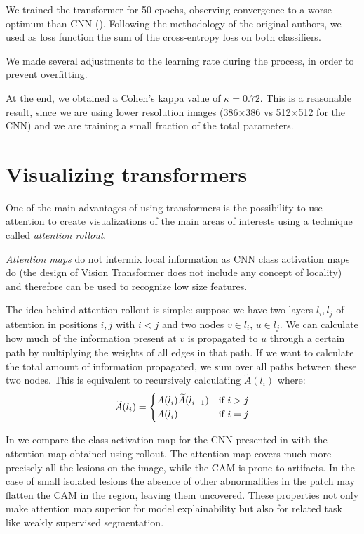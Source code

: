 We trained the transformer for 50 epochs, observing convergence to a worse optimum than CNN (). Following the methodology of the original authors, we used as loss function the sum of the cross-entropy loss on both classifiers.

We made several adjustments to the learning rate during the process, in order to prevent overfitting. 

At the end, we obtained a Cohen's kappa value of \( \kappa = 0.72 \). This is a reasonable result, since we are using lower resolution images (386×386 vs 512×512 for the CNN) and we are training a small fraction of the total parameters.

\section{Visualizing transformers}
One of the main advantages of using transformers is the possibility to use attention to create visualizations of the main areas of interests using a technique called \textit{attention rollout}\cite{abnar2020quantifying}.

\textit{Attention maps} do not intermix local information as CNN class activation maps do (the design of Vision Transformer does not include any concept of locality) and therefore can be used to recognize low size features\cite{dosovitskiy2020image}.

The idea behind attention rollout is simple: suppose we have two layers \( l_i, l_j \) of attention in positions \( i, j \) with \( i < j\) and two nodes \( v \in l_i \), \( u \in l_j \). We can calculate how much of the information present at \( v \) is propagated to \( u \) through a certain path by multiplying the weights of all edges in that path. If we want to calculate the total amount of information propagated, we sum over all paths between these two nodes. This is equivalent to recursively calculating \( \widetilde{A}(l_{i})\) where:
\[
\widetilde{A}(l_{i}) = \begin{cases}
A(l_i) \widetilde{A}(l_{i-1}) & \text{if \( i > j\)} \\
A(l_i)  & \text{if \( i = j\)} \\
\end{cases}
\]

In  we compare the class activation map for the CNN presented in  with the attention map obtained using rollout. The attention map covers much more precisely all the lesions on the image, while the CAM is prone to artifacts. In the case of small isolated lesions the absence of other abnormalities in the patch may flatten the CAM in the region, leaving them uncovered. These properties not only make attention map superior for model explainability but also for related task like weakly supervised segmentation.

